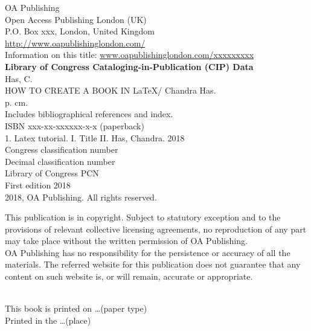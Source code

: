 
{	
	
 \raggedright
	OA Publishing\\
	Open Access Publishing London (UK)\\
	P.O. Box xxx, London, United Kingdom\\[5mm]
	
	\url{http://www.oapublishinglondon.com/}\\
	Information on this title: \url{www.oapublishinglondon.com/xxxxxxxxx}\\[5mm]
	
	{\bfseries Library of Congress Cataloging-in-Publication (CIP) Data}\\[5mm]
	
	Has, C.\\
	\hskip10mm HOW TO CREATE A BOOK IN \LaTeX/ Chandra Has.\\
	\hskip10mm  p. cm.\\
	\hskip10mm  Includes bibliographical references and index.\\
	\hskip10mm  ISBN xxx-xx-xxxxxx-x-x (paperback)\\
	\hskip10mm  1. Latex tutorial. I. Title II. Has, Chandra. 2018\\
	
	Congress classification number\\
	Decimal classification number\\
	Library of Congress PCN \\[5mm]
	
	First edition 2018\\[10mm]
	
	\textcopyright{} 2018, OA Publishing. All rights reserved.\\[3mm]
	
	\begin{minipage}{0.85\linewidth}
		This publication is in copyright. Subject to statutory exception
		and to the provisions of relevant collective licensing agreements,
		no reproduction of any part may take place without the written
		permission of OA Publishing.\\[-2mm]
		
		OA Publishing has no responsibility for the persistence or accuracy of all the materials. The referred website for this publication does not guarantee that any content on such website is, or will remain, accurate or appropriate. 
	\end{minipage}
	\\[5mm]
	
	This book is printed on \ldots (paper type)\\
	Printed in the \ldots (place)
	
}

\cleardoublepage









